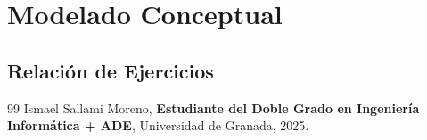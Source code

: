 \documentclass[a4paper,12pt]{book}
\begin{document}
\chapter{Modelado Conceptual}
\section{Relación de Ejercicios}





%



\newpage
\begin{thebibliography}{99}
Ismael Sallami Moreno, \textbf{Estudiante del Doble Grado en Ingeniería Informática + ADE}, Universidad de Granada, 2025.

\end{thebibliography}
\end{document}
